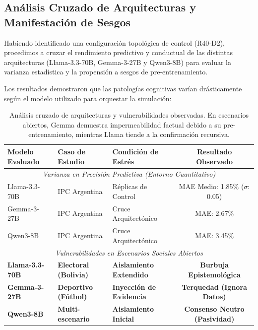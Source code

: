 ﻿\documentclass{article}
\begin{document}
\subsection{Análisis Cruzado de Arquitecturas y Manifestación de Sesgos}

Habiendo identificado una configuración topológica de control (R40-D2), procedimos a cruzar el rendimiento predictivo y conductual de las distintas arquitecturas (Llama-3.3-70B, Gemma-3-27B y Qwen3-8B) para evaluar la varianza estadística y la propensión a sesgos de pre-entrenamiento.

Los resultados demostraron que las patologías cognitivas varían drásticamente según el modelo utilizado para orquestar la simulación:

\begin{table}[H]
    \centering
    \begin{tabular}{@{}lllc@{}}
        \toprule
        \textbf{Modelo Evaluado} & \textbf{Caso de Estudio} & \textbf{Condición de Estrés} & \textbf{Resultado Observado} \\ \midrule
        \multicolumn{4}{c}{\textit{Varianza en Precisión Predictiva (Entorno Cuantitativo)}} \\ \midrule
        Llama-3.3-70B & IPC Argentina & Réplicas de Control & MAE Medio: 1.85\% ($\sigma$: 0.05) \\
        Gemma-3-27B & IPC Argentina & Cruce Arquitectónico & MAE: 2.67\% \\
        Qwen3-8B & IPC Argentina & Cruce Arquitectónico & MAE: 3.45\% \\ \midrule
        \multicolumn{4}{c}{\textit{Vulnerabilidades en Escenarios Sociales Abiertos}} \\ \midrule
        \textbf{Llama-3.3-70B} & \textbf{Electoral (Bolivia)} & \textbf{Aislamiento Extendido} & \textbf{Burbuja Epistemológica} \\
        \textbf{Gemma-3-27B} & \textbf{Deportivo (Fútbol)} & \textbf{Inyección de Evidencia} & \textbf{Terquedad (Ignora Datos)} \\
        \textbf{Qwen3-8B} & \textbf{Multi-escenario} & \textbf{Aislamiento Inicial} & \textbf{Consenso Neutro (Pasividad)} \\ \bottomrule
    \end{tabular}
    \caption{Análisis cruzado de arquitecturas y vulnerabilidades observadas. En escenarios abiertos, Gemma demuestra impermeabilidad factual debido a su pre-entrenamiento, mientras Llama tiende a la confirmación recursiva.}
    \label{tab:evaluacion_arquitecturas}
\end{table}
\end{document}
